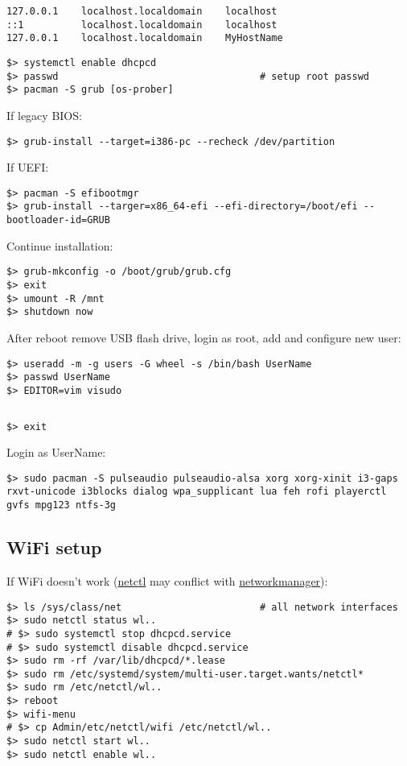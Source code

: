 \documentclass[a4paper, 12pt]{article}
\begin{document}
\begin{lstlisting}[style=style_file,caption={/etc/hosts add lines:}]
127.0.0.1    localhost.localdomain    localhost
::1          localhost.localdomain    localhost
127.0.0.1    localhost.localdomain    MyHostName
\end{lstlisting}

\begin{lstlisting}
$> systemctl enable dhcpcd
$> passwd                                   # setup root passwd
$> pacman -S grub [os-prober]
\end{lstlisting}

If legacy BIOS:
\begin{lstlisting}
$> grub-install --target=i386-pc --recheck /dev/partition
\end{lstlisting}

If UEFI:
\begin{lstlisting}
$> pacman -S efibootmgr
$> grub-install --targer=x86_64-efi --efi-directory=/boot/efi --bootloader-id=GRUB
\end{lstlisting}

Continue installation:
\begin{lstlisting}
$> grub-mkconfig -o /boot/grub/grub.cfg
$> exit
$> umount -R /mnt
$> shutdown now
\end{lstlisting}

After reboot remove USB flash drive, login as root, add and configure new user:
\begin{lstlisting}
$> useradd -m -g users -G wheel -s /bin/bash UserName
$> passwd UserName
$> EDITOR=vim visudo
\end{lstlisting}

\begin{lstlisting}[style=style_file,caption={sudoers uncomment:}]
%wheel=ALL (ALL) ALL
\end{lstlisting}

\begin{lstlisting}
$> exit
\end{lstlisting}

Login as UserName:
\begin{lstlisting}
$> sudo pacman -S pulseaudio pulseaudio-alsa xorg xorg-xinit i3-gaps rxvt-unicode i3blocks dialog wpa_supplicant lua feh rofi playerctl gvfs mpg123 ntfs-3g
\end{lstlisting}

\subsection{WiFi setup}
If WiFi doesn't work (\url{netctl} may conflict with \url{networkmanager}):
\begin{lstlisting}
$> ls /sys/class/net                        # all network interfaces
$> sudo netctl status wl..
# $> sudo systemctl stop dhcpcd.service
# $> sudo systemctl disable dhcpcd.service
$> sudo rm -rf /var/lib/dhcpcd/*.lease
$> sudo rm /etc/systemd/system/multi-user.target.wants/netctl*
$> sudo rm /etc/netctl/wl..
$> reboot
$> wifi-menu
# $> cp Admin/etc/netctl/wifi /etc/netctl/wl..
$> sudo netctl start wl..
$> sudo netctl enable wl..
\end{lstlisting}
\end{document}
